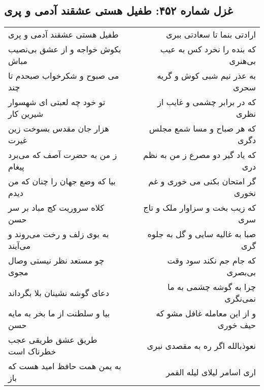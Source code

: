 \begin{center}
\section*{غزل شماره ۴۵۲: طفیل هستی عشقند آدمی و پری}
\label{sec:sh452}
\begin{longtable}{l p{0.5cm} r}
طفیل هستی عشقند آدمی و پری
&&
ارادتی بنما تا سعادتی ببری
\\
بکوش خواجه و از عشق بی‌نصیب مباش
&&
که بنده را نخرد کس به عیب بی‌هنری
\\
می صبوح و شکرخواب صبحدم تا چند
&&
به عذر نیم شبی کوش و گریه سحری
\\
تو خود چه لعبتی ای شهسوار شیرین کار
&&
که در برابر چشمی و غایب از نظری
\\
هزار جان مقدس بسوخت زین غیرت
&&
که هر صباح و مسا شمع مجلس دگری
\\
ز من به حضرت آصف که می‌برد پیغام
&&
که یاد گیر دو مصرع ز من به نظم دری
\\
بیا که وضع جهان را چنان که من دیدم
&&
گر امتحان بکنی می خوری و غم نخوری
\\
کلاه سروریت کج مباد بر سر حسن
&&
که زیب بخت و سزاوار ملک و تاج سری
\\
به بوی زلف و رخت می‌روند و می‌آیند
&&
صبا به غالیه سایی و گل به جلوه گری
\\
چو مستعد نظر نیستی وصال مجوی
&&
که جام جم نکند سود وقت بی‌بصری
\\
دعای گوشه نشینان بلا بگرداند
&&
چرا به گوشه چشمی به ما نمی‌نگری
\\
بیا و سلطنت از ما بخر به مایه حسن
&&
و از این معامله غافل مشو که حیف خوری
\\
طریق عشق طریقی عجب خطرناک است
&&
نعوذبالله اگر ره به مقصدی نبری
\\
به یمن همت حافظ امید هست که باز
&&
اری اسامر لیلای لیله القمر
\\
\end{longtable}
\end{center}
